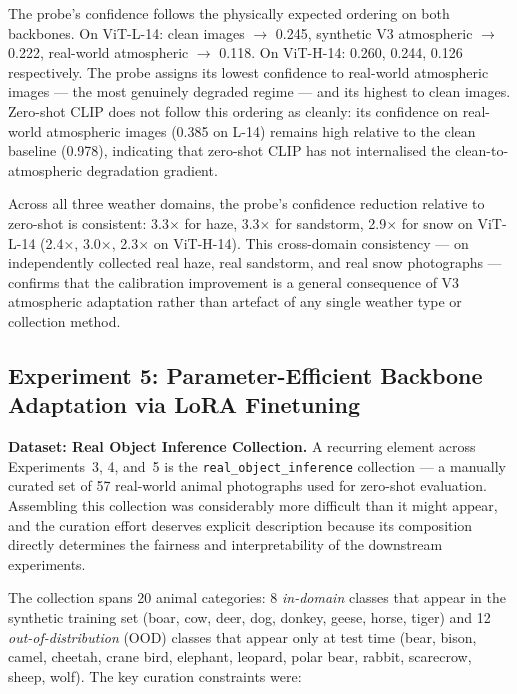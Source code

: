\noindent The probe's confidence follows the physically expected ordering on both backbones. On ViT-L-14: clean images $\rightarrow$ 0.245, synthetic V3 atmospheric $\rightarrow$ 0.222, real-world atmospheric $\rightarrow$ 0.118. On ViT-H-14: 0.260, 0.244, 0.126 respectively. The probe assigns its lowest confidence to real-world atmospheric images — the most genuinely degraded regime — and its highest to clean images. Zero-shot CLIP does not follow this ordering as cleanly: its confidence on real-world atmospheric images (0.385 on L-14) remains high relative to the clean baseline (0.978), indicating that zero-shot CLIP has not internalised the clean-to-atmospheric degradation gradient.

\noindent Across all three weather domains, the probe's confidence reduction relative to zero-shot is consistent: 3.3$\times$ for haze, 3.3$\times$ for sandstorm, 2.9$\times$ for snow on ViT-L-14 (2.4$\times$, 3.0$\times$, 2.3$\times$ on ViT-H-14). This cross-domain consistency — on independently collected real haze, real sandstorm, and real snow photographs — confirms that the calibration improvement is a general consequence of V3 atmospheric adaptation rather than artefact of any single weather type or collection method.

\FloatBarrier
\subsection{Experiment 5: Parameter-Efficient Backbone Adaptation via LoRA Finetuning}
\label{sec:exp5}

\noindent \textbf{Dataset: Real Object Inference Collection.}
A recurring element across Experiments~3, 4, and~5 is the \texttt{real\_object\_inference} collection --- a manually curated set of 57 real-world animal photographs used for zero-shot evaluation. Assembling this collection was considerably more difficult than it might appear, and the curation effort deserves explicit description because its composition directly determines the fairness and interpretability of the downstream experiments.

The collection spans 20 animal categories: 8 \emph{in-domain} classes that appear in the synthetic training set (boar, cow, deer, dog, donkey, geese, horse, tiger) and 12 \emph{out-of-distribution} (OOD) classes that appear only at test time (bear, bison, camel, cheetah, crane bird, elephant, leopard, polar bear, rabbit, scarecrow, sheep, wolf). The key curation constraints were:

